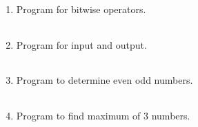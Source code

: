 \documentclass{exam}
\begin{document}
\begin{enumerate}
   \item  Program for bitwise operators.

   \begin{myTableStyle}
   \begin{center} \begin{tabular}{ |m{14cm}| } \hline
              \\ \hline
    \end{tabular} \end{center}
\end{myTableStyle}
  \pagebreak

   \item  Program for input and output.

   \begin{myTableStyle}
   \begin{center} \begin{tabular}{ |m{14cm}| } \hline
              \\ \hline
    \end{tabular} \end{center}
\end{myTableStyle}
  \pagebreak

   \item  Program to determine even odd numbers.

   \begin{myTableStyle}
   \begin{center} \begin{tabular}{ |m{14cm}| } \hline
              \\ \hline
    \end{tabular} \end{center}
\end{myTableStyle}
  \pagebreak

   \item  Program to find maximum of 3 numbers.

   \begin{myTableStyle}
   \begin{center} \begin{tabular}{ |m{14cm}| } \hline
              \\ \hline
    \end{tabular} \end{center}
\end{myTableStyle}
  \pagebreak


\end{enumerate}
\end{document}
